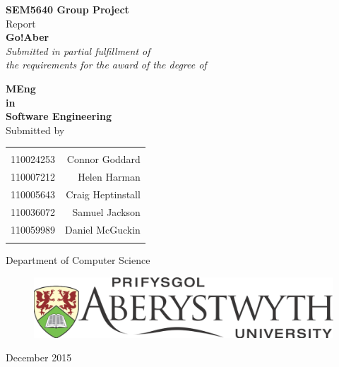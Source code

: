 \begin{titlepage}

\begin{center}

\textup{\small {\bf SEM5640 Group Project} \\ Report}\\[0.2in]

\Large \textbf {Go!Aber}\\[0.5in]

       \small \emph{Submitted in partial fulfillment of\\
        the requirements for the award of the degree of}
        \vspace{.2in}

       {\bf MEng  \\in\\ Software Engineering}\\[0.5in]

\normalsize Submitted by \\
\begin{table}[h]
\centering
\begin{tabular}{lr}\hline \\
110024253 & Connor Goddard \\
110007212 & Helen Harman \\ 
110005643 & Craig Heptinstall \\
110036072 & Samuel Jackson \\ 
110059989 & Daniel McGuckin \\ \\ \hline 
\end{tabular}
\end{table}

\vspace{.1in}

\Large{Department of Computer Science}\\
\vspace{.4in}
\normalsize
\begin{figure}[H]
\begin{center}
\includegraphics[scale=0.2]{images/Aberystwyth_University_logo.png} 
\end{center}
\end{figure}
December 2015

\end{center}

\end{titlepage}
